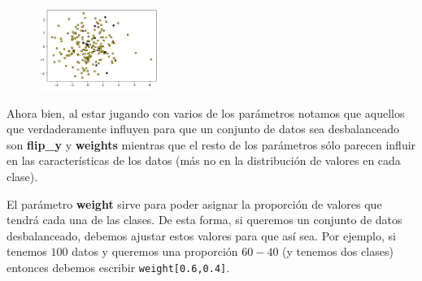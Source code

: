 \documentclass[letterpaper,11pt]{article}
\begin{document}
\begin{enumerate}
\begin{figure}[ht]
        {{\includegraphics[width=0.35\textwidth]{imagenes/experimento5.png}}}
        \qquad
    \end{figure}
    \begin{figure}[ht]
        \centering
        \qquad
    \end{figure}

    \newpage
    Ahora bien, al estar jugando con varios de los parámetros notamos que 
    aquellos que verdaderamente influyen para que un conjunto de datos sea 
    desbalanceado son \textbf{flip\_y} y \textbf{weights} mientras que el resto 
    de los parámetros sólo parecen influir en las características de los datos 
    (más no en la distribución de valores en cada clase).

    El parámetro \textbf{weight} sirve para poder asignar la proporción de 
    valores que tendrá cada una de las clases. De esta forma, si queremos un 
    conjunto de datos desbalanceado, debemos ajustar estos valores para que 
    así sea.  Por ejemplo, si tenemos $100$ datos y queremos una proporción 
    $60-40$ (y tenemos dos clases) entonces debemos escribir 
    \texttt{weight[0.6,0.4]}.


\end{enumerate}
\end{document}
